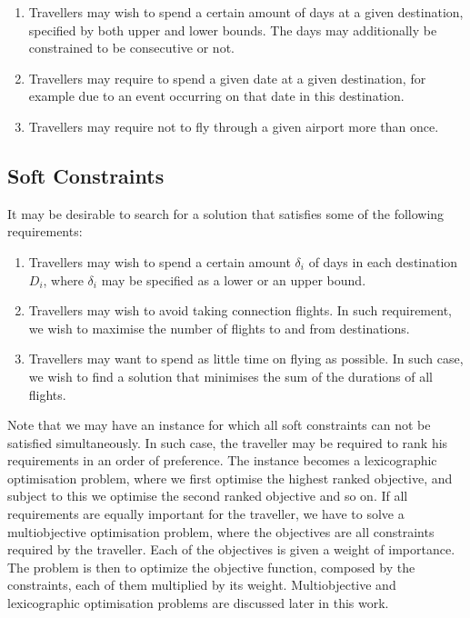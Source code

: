 \documentclass{mprop}
\theoremstyle{definition}
\begin{document}
\begin{enumerate}
\item Travellers may wish to spend a certain amount of days at a given destination, specified by both upper and lower bounds. The days may additionally be constrained to be consecutive or not.

\item Travellers may require to spend a given date at a given destination, for example due to an event occurring on that date in this destination.

\item Travellers may require not to fly through a given airport more than once.
\end{enumerate}

\subsection{Soft Constraints}
\label{subsec:softconstraints}
It may be desirable to search for a solution that satisfies some of the following requirements:

\begin{enumerate}
\item Travellers may wish to spend a certain amount $\delta_{i}$ of days in each destination $D_{i}$, where $\delta_{i}$ may be specified as a lower or an upper bound.

\item Travellers may wish to avoid taking connection flights. In such requirement, we wish to maximise the number of flights to and from destinations.

\item Travellers may want to spend as little time on flying as possible. In such case, we wish to find a solution that minimises the sum of the durations of all flights.
\end{enumerate}

Note that we may have an instance for which all soft constraints can not be satisfied simultaneously. In such case, the traveller may be required to rank his requirements in an order of preference. The instance becomes a lexicographic optimisation problem, where we first optimise the highest ranked objective, and subject to this we optimise the second ranked objective and so on.
If all requirements are equally important for the traveller, we have to solve a multiobjective optimisation problem, where the objectives are all constraints required by the traveller. Each of the objectives is given a weight of importance. The problem is then to optimize the objective function, composed by the constraints, each of them multiplied by its weight. Multiobjective and lexicographic optimisation problems are discussed later in this work. %
\end{document}
